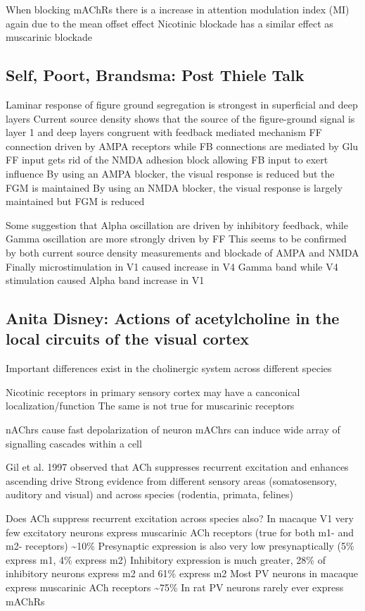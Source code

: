 \documentclass[11pt]{Science}
\begin{document}
When blocking mAChRs there is a increase in attention modulation index (MI) again due to the mean offset effect
Nicotinic blockade has a similar effect as muscarinic blockade

\subsection{Self, Poort, Brandsma: Post Thiele Talk}
\label{sec-2.12}


Laminar response of figure ground segregation is strongest in superficial and deep layers
Current source density shows that the source of the figure-ground signal is layer 1 and deep layers congruent with feedback mediated mechanism
FF connection driven by AMPA receptors while FB connections are mediated by Glu
FF input gets rid of the NMDA adhesion block allowing FB input to exert influence
By using an AMPA blocker, the visual response is reduced but the FGM is maintained
By using an NMDA blocker, the visual response is largely maintained but FGM is reduced

Some suggestion that Alpha oscillation are driven by inhibitory feedback, while Gamma oscillation are more strongly driven by FF
This seems to be confirmed by both current source density measurements and blockade of AMPA and NMDA
Finally microstimulation in V1 caused increase in V4 Gamma band while V4 stimulation caused Alpha band increase in V1

\subsection{Anita Disney: Actions of acetylcholine in the local circuits of the visual cortex}
\label{sec-2.13}


Important differences exist in the cholinergic system across different species

Nicotinic receptors in primary sensory cortex may have a canconical localization/function
The same is not true for muscarinic receptors

nAChrs cause fast depolarization of neuron
mAChrs can induce wide array of signalling cascades within a cell

Gil et al. 1997 observed that ACh suppresses recurrent excitation and enhances ascending drive
Strong evidence from different sensory areas (somatosensory, auditory and visual) and across species (rodentia, primata, felines)

Does ACh suppress recurrent excitation across species also?
In macaque V1 very few excitatory neurons express muscarinic ACh receptors (true for both m1- and m2- receptors) \~{}10\%
Presynaptic expression is also very low presynaptically (5\% express m1, 4\% express m2)
Inhibitory expression is much greater, 28\% of inhibitory neurons express m2 and 61\% express m2
Most PV neurons in macaque express muscarinic ACh receptors \~{}75\%
In rat PV neurons rarely ever express mAChRs
\end{document}
